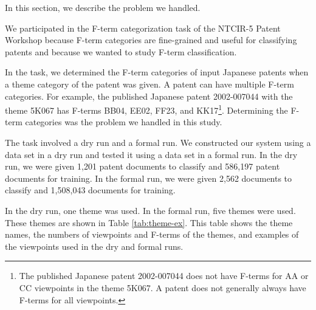 \documentclass[english]{jnlp_1.2c}
\begin{document}
In this section, 
we describe the problem we handled.

We participated in the F-term categorization task of the NTCIR-5 Patent Workshop \cite{Ntcir5_patent_web_2,Ntcir5_patent_2} 
because F-term categories are fine-grained and useful for classifying patents
and because we wanted to study F-term classification.

In the task, we determined the F-term categories of input Japanese patents 
when a theme category of the patent was given. 
A patent can have multiple F-term categories. 
For example, 
the published Japanese patent 2002-007044
with the theme 5K067
has F-terms BB04, EE02, FF23, and KK17\footnote{The published Japanese patent 2002-007044 
does not have F-terms for AA or CC viewpoints in the theme 5K067.
A patent does not generally always have F-terms for all viewpoints.}.
Determining the F-term categories was the problem we handled in this study.

The task involved a dry run and a formal run. 
We constructed our system using a data set in a dry run 
and tested it  using a data set in a formal run. 
In the dry run, 
we were given 1,201 patent documents to classify 
and 586,197 patent documents for training. 
In the formal run, we were given 2,562 documents to classify 
and 1,508,043 documents for training. 

In the dry run, one theme was used. 
In the formal run, five themes were used. 
These themes are shown in Table \ref{tab:theme-ex}. 
This table shows 
the theme names, the numbers of viewpoints and F-terms of the themes, 
and examples of the viewpoints 
used in the dry and formal runs. 
\end{document}
